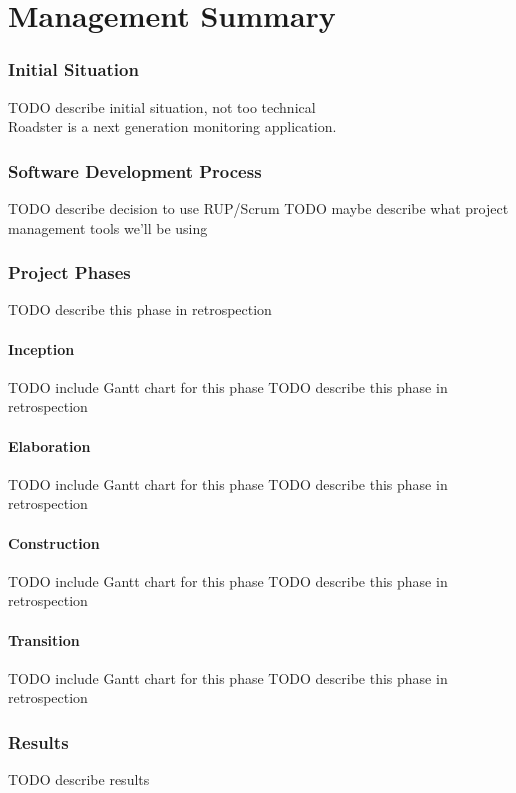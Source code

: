 \part*{Management Summary}\label{part:mgmtsummary}
\setcounter{secnumdepth}{0} %

\section*{Initial Situation}
TODO describe initial situation, not too technical\\

Roadster is a next generation monitoring application.

\section*{Software Development Process}
TODO describe decision to use RUP/Scrum
TODO maybe describe what project management tools we'll be using

\section*{Project Phases}
TODO describe this phase in retrospection

\subsection*{Inception}
TODO include Gantt chart for this phase
TODO describe this phase in retrospection

\subsection*{Elaboration}
TODO include Gantt chart for this phase
TODO describe this phase in retrospection

\subsection*{Construction}
TODO include Gantt chart for this phase
TODO describe this phase in retrospection

\subsection*{Transition}
TODO include Gantt chart for this phase
TODO describe this phase in retrospection

\section*{Results}
TODO describe results
